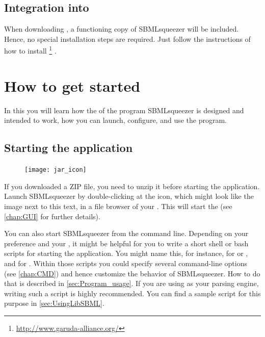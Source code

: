 \section{Integration into \Garuda}
\label{sec:GarudaInstall}

When downloading \Garuda, a functioning copy of SBMLsqueezer will be included.
Hence, no special installation steps are required. Just follow the instructions
of how to install \Garuda\footnote{\url{http://www.garuda-alliance.org/}} \citep{Ghosh2011}.



\chapter{How to get started}
\label{chap:GUI}

In this  you will learn how the \GUI of the program
SBMLsqueezer is designed and intended to work, how you can launch, configure,
and use the program.

\section{Starting the application}
\label{startingTheProgram}

\begin{figure}
\vspace{\wrapfigspace}
\texttt{[image: jar\_icon]}
\end{figure}
If you downloaded a ZIP file, you need to unzip it before starting the application.
Launch SBMLsqueezer by double-clicking at the \Java icon, which might look like the
image next to this text, in a file browser of your \OS.
This will start the \GUI (see \vref{chap:GUI} for further details).

You can also start SBMLsqueezer from the command line.
Depending on your preference and your \OS, it might be helpful for
you to write a short shell or bash scripts for starting the application.
You might name this, for instance,  for \Linux or \MacOSX, and
 for \Windows. Within those scripts you could specify several
command-line options (see \vref{chap:CMD}) and hence customize the behavior of SBMLsqueezer.
How to do that is described in \vref{sec:Program_usage}.
If you are using \libSBML as your \SBML parsing engine, writing such a script is highly recommended.
You can find a sample script for this purpose in \vref{sec:UsingLibSBML}.

